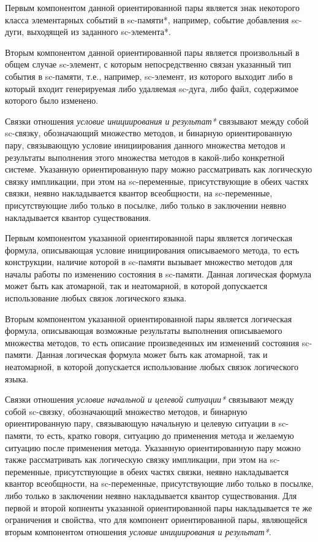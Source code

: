 Первым компонентом данной ориентированной пары является знак некоторого класса элементарных событий в sc-памяти*, например, событие добавления sc-дуги, выходящей из заданного sc-элемента*.

Вторым компонентом данной ориентированной пары является произвольный в общем случае sc-элемент, с которым непосредственно связан указанный тип события в sc-памяти, т.е., например, sc-элемент, из которого выходит либо в который входит генерируемая либо удаляемая sc-дуга, либо файл, содержимое которого было изменено.

Связки отношения \textit{условие инициирования и результат*} связывают между собой sc-связку, обозначающий множество методов, и бинарную ориентированную пару, связывающую условие инициирования данного множества методов и результаты выполнения этого множества методов в какой-либо конкретной системе. Указанную ориентированную пару можно рассматривать как логическую связку импликации, при этом на sc-переменные, присутствующие в обеих частях связки, неявно накладывается квантор всеобщности, на
sc-переменные, присутствующие либо только в посылке, либо только в заключении неявно накладывается
квантор существования.

Первым компонентом указанной ориентированной пары является логическая формула, описывающая условие инициирования описываемого метода, то есть конструкции, наличие которой в sc-памяти вызывает множество методов для началы работы по изменению состояния в sc-памяти. Данная логическая формула может быть как атомарной, так и неатомарной, в которой допускается использование любых связок логического языка.

Вторым компонентом указанной ориентированной пары является логическая формула, описывающая возможные результаты выполнения описываемого множества методов, то есть описание произведенных им изменений состояния sc-памяти. Данная логическая формула может быть как атомарной, так и неатомарной, в которой допускается использование любых связок логического языка.

Связки отношения \textit{условие начальной и целевой ситуации*} связывают между собой sc-связку, обозначающий множество методов, и бинарную ориентированную пару, связывающую начальную и целевую ситуации в sc-памяти, то есть, кратко говоря, ситуацию до применения метода и желаемую ситуацию после применения метода. Указанную ориентированную пару можно также рассматривать как логическую связку импликации, при этом на sc-переменные, присутствующие в обеих частях связки, неявно накладывается квантор всеобщности, на sc-переменные, присутствующие либо только в посылке, либо только в заключении неявно накладывается квантор существования. Для первой и второй копненты указанной ориентированной пары накладывается те же ограничения и свойства, что для компонент ориентированной пары, являющейся вторым компонентом отношения \textit{условие инициирования и результат*}.

